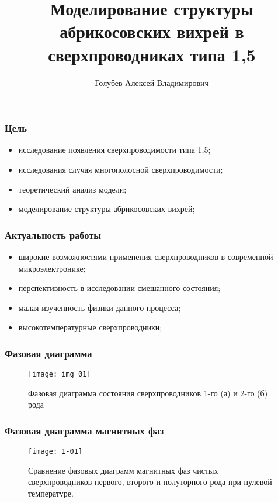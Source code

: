 \title{Моделирование структуры абрикосовских вихрей в сверхпроводниках 
    типа 1,5}
\author{Голубев Алексей Владимирович}
\date{}

\begin{frame}
    \titlepage
\end{frame}

\begin{frame}
    \frametitle{Цель}
    \begin{itemize}
        \item исследование появления сверхпроводимости типа 1,5;
        \item исследования случая многополосной сверхпроводимости;
        \item теоретический анализ модели;
        \item моделирование структуры абрикосовских вихрей;
    \end{itemize}
\end{frame}

\begin{frame}
    \frametitle{Актуальность работы}
    \begin{itemize}
        \item широкие возможностями применения сверхпроводников в 
            современной микроэлектронике;
        \item перспективность в исследовании смешанного состояния;
        \item малая изученность физики данного процесса;
        \item высокотемпературные сверхпроводники;
    \end{itemize}
\end{frame}

\begin{frame}
    \frametitle{Фазовая диаграмма}
    \begin{figure}[h]
        \center
        \texttt{[image: img\_01]}
        \caption{Фазовая диаграмма состояния сверхпроводников 1-го (а) и 
            2-го (б) рода}
    \end{figure}
\end{frame}

\begin{frame}
    \frametitle{Фазовая диаграмма магнитных фаз}
    \begin{figure}[h]
        \center
        \texttt{[image: 1-01]}
        \caption{Сравнение фазовых диаграмм магнитных фаз чистых 
            сверхпроводников первого, второго и полуторного рода при нулевой 
            температуре.}
    \end{figure}
\end{frame}

